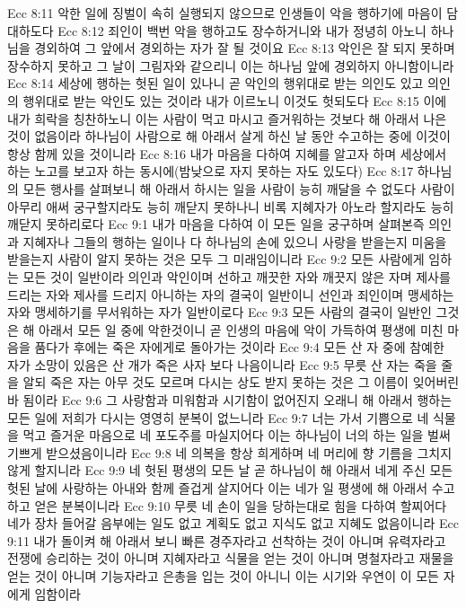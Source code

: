 Ecc 8:11  악한 일에 징벌이 속히 실행되지 않으므로 인생들이 악을 행하기에 마음이 담대하도다
Ecc 8:12  죄인이 백번 악을 행하고도 장수하거니와 내가 정녕히 아노니 하나님을 경외하여 그 앞에서 경외하는 자가 잘 될 것이요
Ecc 8:13  악인은 잘 되지 못하며 장수하지 못하고 그 날이 그림자와 같으리니 이는 하나님 앞에 경외하지 아니함이니라
Ecc 8:14  세상에 행하는 헛된 일이 있나니 곧 악인의 행위대로 받는 의인도 있고 의인의 행위대로 받는 악인도 있는 것이라 내가 이르노니 이것도 헛되도다
Ecc 8:15  이에 내가 희락을 칭찬하노니 이는 사람이 먹고 마시고 즐거워하는 것보다 해 아래서 나은 것이 없음이라 하나님이 사람으로 해 아래서 살게 하신 날 동안 수고하는 중에 이것이 항상 함께 있을 것이니라
Ecc 8:16  내가 마음을 다하여 지혜를 알고자 하며 세상에서 하는 노고를 보고자 하는 동시에(밤낮으로 자지 못하는 자도 있도다)
Ecc 8:17  하나님의 모든 행사를 살펴보니 해 아래서 하시는 일을 사람이 능히 깨달을 수 없도다 사람이 아무리 애써 궁구할지라도 능히 깨닫지 못하나니 비록 지혜자가 아노라 할지라도 능히 깨닫지 못하리로다
Ecc 9:1  내가 마음을 다하여 이 모든 일을 궁구하며 살펴본즉 의인과 지혜자나 그들의 행하는 일이나 다 하나님의 손에 있으니 사랑을 받을는지 미움을 받을는지 사람이 알지 못하는 것은 모두 그 미래임이니라
Ecc 9:2  모든 사람에게 임하는 모든 것이 일반이라 의인과 악인이며 선하고 깨끗한 자와 깨끗지 않은 자며 제사를 드리는 자와 제사를 드리지 아니하는 자의 결국이 일반이니 선인과 죄인이며 맹세하는 자와 맹세하기를 무서워하는 자가 일반이로다
Ecc 9:3  모든 사람의 결국이 일반인 그것은 해 아래서 모든 일 중에 악한것이니 곧 인생의 마음에 악이 가득하여 평생에 미친 마음을 품다가 후에는 죽은 자에게로 돌아가는 것이라
Ecc 9:4  모든 산 자 중에 참예한 자가 소망이 있음은 산 개가 죽은 사자 보다 나음이니라
Ecc 9:5  무릇 산 자는 죽을 줄을 알되 죽은 자는 아무 것도 모르며 다시는 상도 받지 못하는 것은 그 이름이 잊어버린 바 됨이라
Ecc 9:6  그 사랑함과 미워함과 시기함이 없어진지 오래니 해 아래서 행하는 모든 일에 저희가 다시는 영영히 분복이 없느니라
Ecc 9:7  너는 가서 기쁨으로 네 식물을 먹고 즐거운 마음으로 네 포도주를 마실지어다 이는 하나님이 너의 하는 일을 벌써 기쁘게 받으셨음이니라
Ecc 9:8  네 의복을 항상 희게하며 네 머리에 향 기름을 그치지 않게 할지니라
Ecc 9:9  네 헛된 평생의 모든 날 곧 하나님이 해 아래서 네게 주신 모든 헛된 날에 사랑하는 아내와 함께 즐겁게 살지어다 이는 네가 일 평생에 해 아래서 수고하고 얻은 분복이니라
Ecc 9:10  무릇 네 손이 일을 당하는대로 힘을 다하여 할찌어다 네가 장차 들어갈 음부에는 일도 없고 계획도 없고 지식도 없고 지혜도 없음이니라
Ecc 9:11  내가 돌이켜 해 아래서 보니 빠른 경주자라고 선착하는 것이 아니며 유력자라고 전쟁에 승리하는 것이 아니며 지혜자라고 식물을 얻는 것이 아니며 명철자라고 재물을 얻는 것이 아니며 기능자라고 은총을 입는 것이 아니니 이는 시기와 우연이 이 모든 자에게 임함이라
